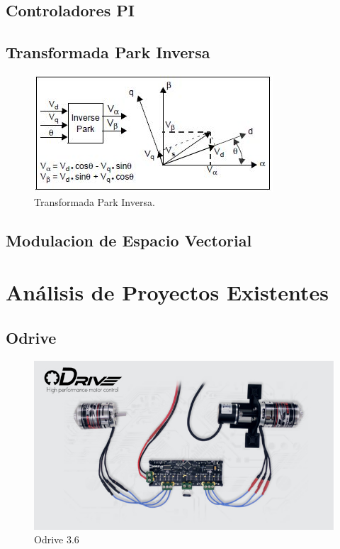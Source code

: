 \documentclass[11pt]{report}
\begin{document}
\subsection{Controladores PI}

\subsection{Transformada Park Inversa}
\begin{figure}[ht]
	\centering
	\includegraphics{imagenes/park_inv.jpg}
	\caption{Transformada Park Inversa.}
\end{figure}

\subsection{Modulacion de Espacio Vectorial}

\newpage
\section{Análisis de Proyectos Existentes}
\subsection{Odrive}

\begin{figure}[ht]
	\centering
	\includegraphics[scale=0.5]{imagenes/odrive_img.jpg}
	\caption{Odrive 3.6}
\end{figure}
\FloatBarrier
\end{document}
